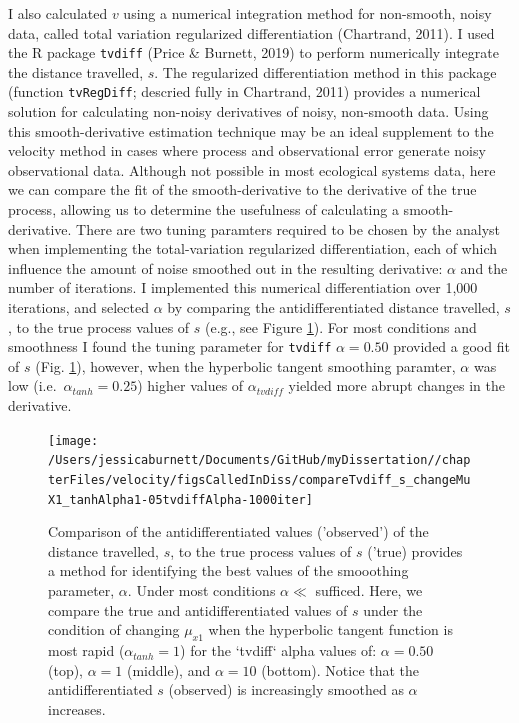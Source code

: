 \documentclass[12pt,twoside,openany]{reedthesis}
\begin{document}
I also calculated \(v\) using a numerical integration method for non-smooth, noisy data, called total variation regularized differentiation (Chartrand, 2011). I used the R package \texttt{tvdiff} (Price \& Burnett, 2019) to perform numerically integrate the distance travelled, \(s\). The regularized differentiation method in this package (function \texttt{tvRegDiff}; descried fully in Chartrand, 2011) provides a numerical solution for calculating non-noisy derivatives of noisy, non-smooth data. Using this smooth-derivative estimation technique may be an ideal supplement to the velocity method in cases where process and observational error generate noisy observational data. Although not possible in most ecological systems data, here we can compare the fit of the smooth-derivative to the derivative of the true process, allowing us to determine the usefulness of calculating a smooth-derivative. There are two tuning paramters required to be chosen by the analyst when implementing the total-variation regularized differentiation, each of which influence the amount of noise smoothed out in the resulting derivative: \(\alpha\) and the number of iterations. I implemented this numerical differentiation over 1,000 iterations, and selected \(\alpha\) by comparing the antidifferentiated distance travelled, \(s\), to the true process values of \(s\) (e.g., see Figure \ref{fig:antiDiffComp}). For most conditions and smoothness I found the tuning parameter for \texttt{tvdiff} \(\alpha=0.50\) provided a good fit of \(s\) (Fig. \ref{fig:antiDiffComp}), however, when the hyperbolic tangent smoothing paramter, \(\alpha\) was low (i.e.~\(\alpha_{tanh}=0.25\)) higher values of \(\alpha_{tvdiff}\) yielded more abrupt changes in the derivative.
\begin{figure}
\texttt{[image: /Users/jessicaburnett/Documents/GitHub/myDissertation//chapterFiles/velocity/figsCalledInDiss/compareTvdiff\_s\_changeMuX1\_tanhAlpha1-05tvdiffAlpha-1000iter]} \caption{Comparison of the antidifferentiated values ('observed') of the distance travelled, $s$, to the true process values of $s$ ('true) provides a method for identifying the best values of the smooothing parameter, $\alpha$. Under most conditions $\alpha \ll$ sufficed. Here, we compare the true and antidifferentiated values of $s$ under the condition of changing $\mu_{x1}$ when the hyperbolic tangent function is most rapid ($\alpha_{tanh}=1$) for the `tvdiff` alpha values of: $\alpha=0.50$ (top), $\alpha=1$ (middle), and $\alpha=10$ (bottom). Notice that the antidifferentiated $s$ (observed) is increasingly smoothed as $\alpha$ increases.}\label{fig:antiDiffComp}
\end{figure}
\end{document}
